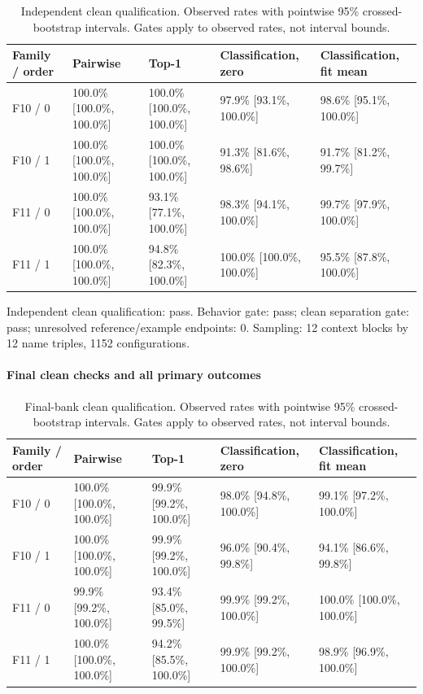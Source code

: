 \begin{table}[htbp]
\centering\footnotesize
\caption{Independent clean qualification. Observed rates with pointwise 95\% crossed-bootstrap intervals. Gates apply to observed rates, not interval bounds.}
\label{tab:b007-qualification}
\begin{tabularx}{\linewidth}{@{}YYYYY@{}}
\toprule
Family / order & Pairwise & Top-1 & Classification, zero & Classification, fit mean \\
\midrule
F10 / 0 & 100.0\% [100.0\%, 100.0\%] & 100.0\% [100.0\%, 100.0\%] & 97.9\% [93.1\%, 100.0\%] & 98.6\% [95.1\%, 100.0\%] \\
F10 / 1 & 100.0\% [100.0\%, 100.0\%] & 100.0\% [100.0\%, 100.0\%] & 91.3\% [81.6\%, 98.6\%] & 91.7\% [81.2\%, 99.7\%] \\
F11 / 0 & 100.0\% [100.0\%, 100.0\%] & 93.1\% [77.1\%, 100.0\%] & 98.3\% [94.1\%, 100.0\%] & 99.7\% [97.9\%, 100.0\%] \\
F11 / 1 & 100.0\% [100.0\%, 100.0\%] & 94.8\% [82.3\%, 100.0\%] & 100.0\% [100.0\%, 100.0\%] & 95.5\% [87.8\%, 100.0\%] \\
\bottomrule
\end{tabularx}
\end{table}

Independent clean qualification: pass. Behavior gate: pass; clean separation gate: pass; unresolved reference/example endpoints: 0. Sampling: 12 context blocks by 12 name triples, 1152 configurations.

\paragraph{Final clean checks and all primary outcomes}

\begin{table}[htbp]
\centering\footnotesize
\caption{Final-bank clean qualification. Observed rates with pointwise 95\% crossed-bootstrap intervals. Gates apply to observed rates, not interval bounds.}
\label{tab:b007-test-qualification}
\begin{tabularx}{\linewidth}{@{}YYYYY@{}}
\toprule
Family / order & Pairwise & Top-1 & Classification, zero & Classification, fit mean \\
\midrule
F10 / 0 & 100.0\% [100.0\%, 100.0\%] & 99.9\% [99.2\%, 100.0\%] & 98.0\% [94.8\%, 100.0\%] & 99.1\% [97.2\%, 100.0\%] \\
F10 / 1 & 100.0\% [100.0\%, 100.0\%] & 99.9\% [99.2\%, 100.0\%] & 96.0\% [90.4\%, 99.8\%] & 94.1\% [86.6\%, 99.8\%] \\
F11 / 0 & 99.9\% [99.2\%, 100.0\%] & 93.4\% [85.0\%, 99.5\%] & 99.9\% [99.2\%, 100.0\%] & 100.0\% [100.0\%, 100.0\%] \\
F11 / 1 & 100.0\% [100.0\%, 100.0\%] & 94.2\% [85.5\%, 100.0\%] & 99.9\% [99.2\%, 100.0\%] & 98.9\% [96.9\%, 100.0\%] \\
\bottomrule
\end{tabularx}
\end{table}

